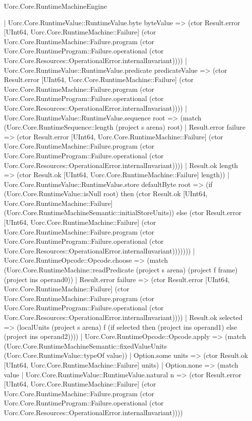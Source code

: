 \begin{lexlean}{Uorc.Core.RuntimeMachineEngine}
\begin{semanticmodule}
{              | Uorc.Core.RuntimeValue::RuntimeValue.byte byteValue => (ctor Result.error [UInt64, Uorc.Core.RuntimeMachine::Failure] (ctor Uorc.Core.RuntimeMachine::Failure.program (ctor Uorc.Core.RuntimeProgram::Failure.operational (ctor Uorc.Core.Resources::OperationalError.internalInvariant))))
              | Uorc.Core.RuntimeValue::RuntimeValue.predicate predicateValue => (ctor Result.error [UInt64, Uorc.Core.RuntimeMachine::Failure] (ctor Uorc.Core.RuntimeMachine::Failure.program (ctor Uorc.Core.RuntimeProgram::Failure.operational (ctor Uorc.Core.Resources::OperationalError.internalInvariant))))
              | Uorc.Core.RuntimeValue::RuntimeValue.sequence root => (match (Uorc.Core.RuntimeSequence::length (project s arena) root)
                | Result.error failure => (ctor Result.error [UInt64, Uorc.Core.RuntimeMachine::Failure] (ctor Uorc.Core.RuntimeMachine::Failure.program (ctor Uorc.Core.RuntimeProgram::Failure.operational (ctor Uorc.Core.Resources::OperationalError.internalInvariant))))
                | Result.ok length => (ctor Result.ok [UInt64, Uorc.Core.RuntimeMachine::Failure] length))
              | Uorc.Core.RuntimeValue::RuntimeValue.store defaultByte root => (if (Uorc.Core.RuntimeValue::isNull root) then (ctor Result.ok [UInt64, Uorc.Core.RuntimeMachine::Failure] (Uorc.Core.RuntimeMachineSemantic::initialStoreUnits)) else (ctor Result.error [UInt64, Uorc.Core.RuntimeMachine::Failure] (ctor Uorc.Core.RuntimeMachine::Failure.program (ctor Uorc.Core.RuntimeProgram::Failure.operational (ctor Uorc.Core.Resources::OperationalError.internalInvariant)))))))
          | Uorc.Core.RuntimeOpcode::Opcode.choose => (match (Uorc.Core.RuntimeMachine::readPredicate (project s arena) (project f frame) (project ins operand0))
            | Result.error failure => (ctor Result.error [UInt64, Uorc.Core.RuntimeMachine::Failure] (ctor Uorc.Core.RuntimeMachine::Failure.program (ctor Uorc.Core.RuntimeProgram::Failure.operational (ctor Uorc.Core.Resources::OperationalError.internalInvariant))))
            | Result.ok selected => (localUnits (project s arena) f (if selected then (project ins operand1) else (project ins operand2))))
          | Uorc.Core.RuntimeOpcode::Opcode.apply => (match (Uorc.Core.RuntimeMachineSemantic::fixedValueUnits (Uorc.Core.RuntimeValue::typeOf value))
            | Option.some units => (ctor Result.ok [UInt64, Uorc.Core.RuntimeMachine::Failure] units)
            | Option.none => (match value
              | Uorc.Core.RuntimeValue::RuntimeValue.natural n => (ctor Result.error [UInt64, Uorc.Core.RuntimeMachine::Failure] (ctor Uorc.Core.RuntimeMachine::Failure.program (ctor Uorc.Core.RuntimeProgram::Failure.operational (ctor Uorc.Core.Resources::OperationalError.internalInvariant))))
}
\end{semanticmodule}
\end{lexlean}
